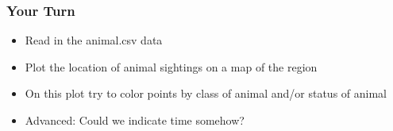\documentclass{beamer}\usepackage[]{graphicx}\usepackage[]{color}
\begin{document}

\begin{frame}
\frametitle{Your Turn}
\begin{itemize}
  \item Read in the animal.csv data 
\bigskip
  \item Plot the location of animal sightings on a map of the region
  \item On this plot try to color points by class of animal and/or status of animal
\bigskip
  \item Advanced: Could we indicate time somehow?
\end{itemize}
\end{frame}
\end{document}
